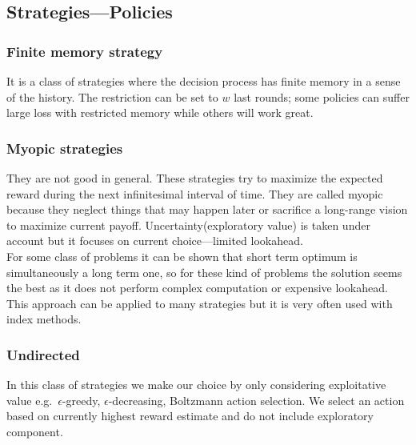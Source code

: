 \documentclass[12pt, a4paper, pdflatex, leqno]{report}
\begin{document}
\subsection{Strategies---Policies}


\subsubsection{Finite memory strategy}
It is a class of strategies where the decision process has finite memory in a sense of the history. The restriction can be set to $w$ last rounds; some policies can suffer large loss with restricted memory while others will work great.\\

\subsubsection{Myopic strategies}
They are not good in general. These strategies try to maximize the expected reward during the next infinitesimal interval of time. They are called myopic because they neglect things that may happen later or sacrifice a long-range vision to maximize current payoff. Uncertainty(exploratory value) is taken under account but it focuses on current choice---limited lookahead.\\

For some class of problems it can be shown that short term optimum is simultaneously a long term one, so for these kind of problems the solution seems the best as it does not perform complex computation or expensive lookahead. This approach can be applied to many strategies but it is very often used with index methods.\\

\subsubsection{Undirected}
In this class of strategies we make our choice by only considering exploitative value e.g.\ $\epsilon$-greedy, $\epsilon$-decreasing, Boltzmann action selection. We select an action based on currently highest reward estimate and do not include exploratory component.\\
\end{document}
